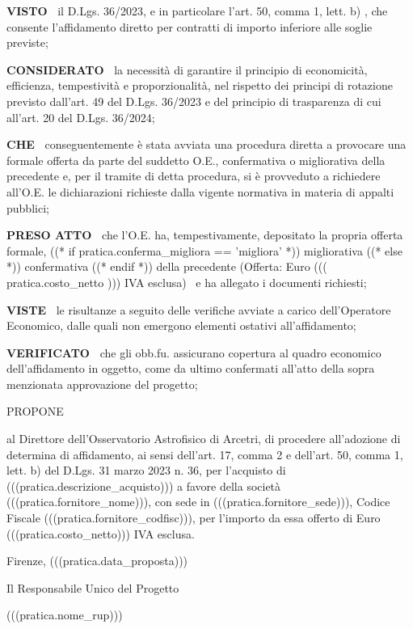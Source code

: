 \textbf{VISTO~}
il D.Lgs. 36/2023, e in particolare l'art. 50, comma 1, lett. b) , che
consente l'affidamento diretto per contratti di importo inferiore alle
soglie previste;


\textbf{CONSIDERATO~}
la necessità di garantire il principio di economicità, efficienza,
tempestività e proporzionalità, nel rispetto dei principi di rotazione
previsto dall'art. 49 del D.Lgs. 36/2023 e del principio di trasparenza
di cui all'art. 20 del D.Lgs. 36/2024;


\textbf{CHE~}
conseguentemente è stata avviata una procedura diretta a provocare una
formale offerta da parte del suddetto O.E., confermativa o migliorativa
della precedente e, per il tramite di detta procedura, si è provveduto
a richiedere all'O.E. le dichiarazioni richieste dalla vigente normativa
in materia di appalti pubblici;


\textbf{PRESO ATTO~}
che l'O.E. ha, tempestivamente, depositato la propria offerta formale,
((* if pratica.conferma_migliora == 'migliora' *)) migliorativa
((* else *)) confermativa ((* endif *))
della precedente (Offerta: Euro ((( pratica.costo_netto )))
IVA esclusa)  e ha allegato i documenti richiesti;


\textbf{VISTE~}
le risultanze a seguito delle verifiche avviate a carico dell'Operatore
Economico, dalle quali non emergono elementi ostativi all'affidamento;


\textbf{VERIFICATO~}
che gli obb.fu. assicurano copertura al quadro economico dell'affidamento
in oggetto, come da ultimo confermati all'atto della sopra menzionata
approvazione del progetto;  



\begin{center}
PROPONE
\end{center}

al Direttore dell'Osservatorio Astrofisico di Arcetri, di procedere
all'adozione di determina di affidamento, ai sensi dell'art. 17, comma
2 e dell'art. 50, comma 1, lett. b) del D.Lgs. 31 marzo 2023 n. 36, per
l'acquisto di (((pratica.descrizione_acquisto))) a favore della società
(((pratica.fornitore_nome))), con sede in (((pratica.fornitore_sede))),
Codice Fiscale (((pratica.fornitore_codfisc))), per l'importo da essa
offerto di Euro (((pratica.costo_netto))) IVA esclusa.


Firenze, (((pratica.data_proposta)))

\begin{flushright}
\begin{minipage}[c]{11cm}
\begin{center}
Il Responsabile Unico del Progetto

	(((pratica.nome_rup)))

\end{center}
\end{minipage}
\end{flushright}


